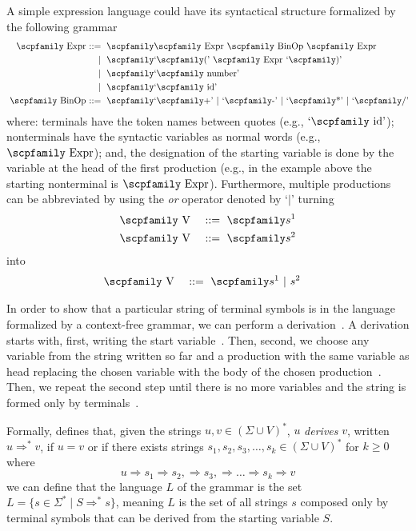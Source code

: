 \documentclass[
  oneside,
  english,
  coorientadorbanca,
  noabntexcite
]{ufsc-thesis-rn46-2019}
\def\bnfdef{::=}
\newcommand{\codett}[1]{\text{\scpfamily#1}}
\newcommand{\code}[1]{\text{\scpfamily\setlength\spaceskip{0.35em}#1}}
\newcommand{\bnfvar}[1]{\codett{#1}}
\newcommand{\bnfter}[1]{\textrm{`}\codett{#1}\textrm{'}}
\newcommand{\bnfor}[1]{{$\mid$} #1}
\newcommand{\bnfprod}[2]{\bnfvar{#1} & \ & \bnfdef{} & \ \code{#2}}
\newcommand{\bnfmore}[1]{            & \ & \mid{}    & \ \code{#1}}
\begin{document}
A simple expression language could have its syntactical structure formalized by the following grammar
\begin{equation}~\label{eq:ambiguous_expr_grammar}
  \begin{alignedat}{2}
    \bnfprod{Expr}{\bnfvar{Expr} \bnfvar{BinOp} \bnfvar{Expr}} \\
    \bnfmore{\bnfter{(} \bnfvar{Expr} \bnfter{)}}               \\
    \bnfmore{\bnfter{number}}                                     \\
    \bnfmore{\bnfter{id}}                                         \\
    \bnfprod{BinOp}{\bnfter{+} \bnfor{\bnfter{-}} \bnfor{\bnfter{*}} \bnfor{\bnfter{/}}}
  \end{alignedat}
\end{equation}
where: terminals have the token names between quotes (e.g., $\bnfter{id}$);
nonterminals have the syntactic variables as normal words (e.g., $\bnfvar{Expr}$);
and, the designation of the starting variable is done by the variable at the head of the first production (e.g., in the example above the starting nonterminal is $\bnfvar{Expr}$).
Furthermore, multiple productions can be abbreviated by using the \textit{or} operator denoted by `$\mid$' turning
\begin{alignat}{2}
  \bnfprod{V}{$s^1$} \nonumber \\
  \bnfprod{V}{$s^2$} \nonumber
\end{alignat}
into
\begin{alignat}{2}
  \bnfprod{V}{$s^1$ \bnfor{$s^2$}} \nonumber
\end{alignat}

In order to show that a particular string of terminal symbols is in the language formalized by a context-free grammar, we can perform a derivation~\cite{sipser2012introduction}.
A derivation starts with, first, writing the start variable~\cite{sipser2012introduction}.
Then, second, we choose any variable from the string written so far and a production with the same variable as head replacing the chosen variable with the body of the chosen production~\cite{sipser2012introduction}.
Then, we repeat the second step until there is no more variables and the string is formed only by terminals~\cite{sipser2012introduction}.

Formally, \textcite{sipser2012introduction} defines that, given the strings $u, v \in {(\Sigma \cup V)}^*$, $u$ \textit{derives} $v$, written $u \Rightarrow^* v$, if $u = v$ or if there exists strings $s_1, s_2, s_3, \dots, s_k \in {(\Sigma \cup V)}^*$ for $k \geq 0$ where
\begin{equation*}
  u \Rightarrow s_1 \Rightarrow  s_2, \Rightarrow s_3, \Rightarrow \dots \Rightarrow s_k \Rightarrow v
\end{equation*}
we can define that the language $L$ of the grammar is the set $L = \{s \in \Sigma^* \mid S \Rightarrow^* s\}$, meaning $L$ is the set of all strings $s$ composed only by terminal symbols that can be derived from the starting variable $S$.
\end{document}
